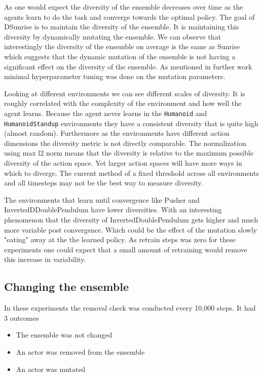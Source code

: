 As one would expect the diversity of the ensemble decreases over time as the agents learn to do the task and converge towards the optimal policy. The goal of DSunrise is to maintain the diversity of the ensemble. It is maintaining this diversity by dynamically mutating the ensemble. We  can observe that interestingly the diversity of the ensemble on average is the same as Sunrise which suggests that the dynamic mutation of the ensemble is not having a significant effect on the diversity of the ensemble. As mentioned in further work minimal hyperparameter tuning was done on the mutation parameters.

Looking at different environments we can see different scales of diversity. It is roughly correlated with the complexity of the environment and how well the agent learns. Because the agent never learns in the \texttt{Humanoid} and \texttt{HumanoidStandup} environments they have a consistent diversity that is quite high (almost random). Furthermore as the environments have different action dimensions the diversity metric is not directly comparable. The normalization using max l2 norm means that the diversity is relative to the maximum possible diversity of the action space. Yet larger action spaces will have more ways in which to diverge. The current method of a fixed threshold across all environments and all timesteps may not be the best way to measure diversity.

The environments that learn until convergence like Pusher and InvertedDDoublePendulum have lower diversities. With an interesting phenomenon that the diversity of InvertedDoublePendulum gets higher and much more variable post convergence. Which could be the effect of the mutation slowly "eating" away at the the learned policy. As retrain steps was zero for these experiments one could expect that a small amount of retraining would remove this increase in variability.

\subsection{Changing the ensemble}

In these experiments the removal check was conducted every 10,000 steps. It had 3 outcomes

\begin{itemize}
    \item The ensemble was not changed
    \item An actor was removed from the ensemble
    \item An actor was mutated
\end{itemize}

